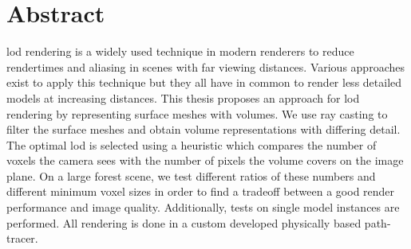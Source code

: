 \chapter*{Abstract}
\acf{lod} rendering is a widely used technique in modern renderers to reduce rendertimes and aliasing in scenes with far viewing distances.
Various approaches exist to apply this technique but they all have in common to render less detailed models at increasing distances.
This thesis proposes an approach for \acf{lod} rendering by representing surface meshes with volumes.
We use ray casting to filter the surface meshes and obtain volume representations with differing detail.
The optimal \ac{lod} is selected using a heuristic which compares the number of voxels the camera sees with the number of pixels the volume covers on the image plane.
On a large forest scene, we test different ratios of these numbers and different minimum voxel sizes in order to find a tradeoff between a good render performance and image quality.
Additionally, tests on single model instances are performed.
All rendering is done in a custom developed physically based path-tracer.